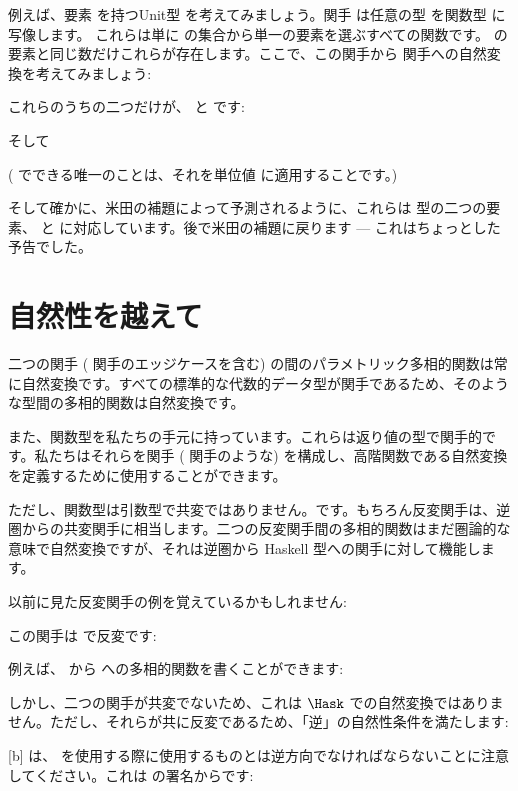 例えば、要素 \code{()} を持つUnit型 \code{()} を考えてみましょう。関手  は任意の型  を関数型  に写像します。
これらは単に  の集合から単一の要素を選ぶすべての関数です。
 の要素と同じ数だけこれらが存在します。ここで、この関手から  関手への自然変換を考えてみましょう: 

これらのうちの二つだけが、 と  です: 

そして

 ( でできる唯一のことは、それを単位値 \code{()} に適用することです。) 

そして確かに、米田の補題によって予測されるように、これらは  型の二つの要素、 と  に対応しています。後で米田の補題に戻ります --- これはちょっとした予告でした。

\section{自然性を越えて}

二つの関手 ( 関手のエッジケースを含む) の間のパラメトリック多相的関数は常に自然変換です。すべての標準的な代数的データ型が関手であるため、そのような型間の多相的関数は自然変換です。

また、関数型を私たちの手元に持っています。これらは返り値の型で関手的です。私たちはそれらを関手 ( 関手のような) を構成し、高階関数である自然変換を定義するために使用することができます。

ただし、関数型は引数型で共変ではありません。です。もちろん反変関手は、逆圏からの共変関手に相当します。二つの反変関手間の多相的関数はまだ圏論的な意味で自然変換ですが、それは逆圏から Haskell 型への関手に対して機能します。

以前に見た反変関手の例を覚えているかもしれません: 

この関手は  で反変です: 

例えば、 から  への多相的関数を書くことができます: 

しかし、二つの関手が共変でないため、これは $\Hask$ での自然変換ではありません。ただし、それらが共に反変であるため、「逆」の自然性条件を満たします: 

[b]
 は、 を使用する際に使用するものとは逆方向でなければならないことに注意してください。これは  の署名からです: 

